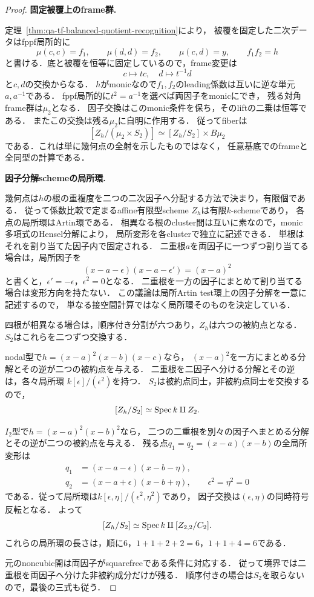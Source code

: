 \begin{proof}
\par\medskip\noindent\textbf{固定被覆上のframe群.}\par\nobreak\smallskip
定理~\ref{thm:qa-tf-balanced-quotient-recognition}により，
被覆を固定した二次データはfppf局所的に
\[
 \mu(c,c)=f_1,\qquad\mu(d,d)=f_2,\qquad
 \mu(c,d)=y,\qquad f_1f_2=h
\]
と書ける．底と被覆を恒等に固定しているので，frame変更は
\[
 c\mapsto tc,\quad d\mapsto t^{-1}d
\]
と$c,d$の交換からなる．
$h$がmonicなので$f_1,f_2$のleading係数は互いに逆な単元$a,a^{-1}$である．
fppf局所的に$t^2=a^{-1}$を選べば両因子をmonicにでき，
残る対角frame群は$\mu_2$となる．
因子交換はこのmonic条件を保ち，そのliftの二乗は恒等である．
またこの交換は残る$\mu_2$に自明に作用する．
従ってfiberは
\[
 [Z_h/(\mu_2\times S_2)]
       \simeq[Z_h/S_2]\times B\mu_2
\]
である．これは単に幾何点の全射を示したものではなく，
任意基底でのframeと全同型の計算である．

\par\medskip\noindent\textbf{因子分解schemeの局所環.}\par\nobreak\smallskip
幾何点は$h$の根の重複度を二つの二次因子へ分配する方法で決まり，有限個である．
従って係数比較で定まるaffine有限型scheme $Z_h$は有限$k$-schemeであり，
各点の局所環はArtin環である．
相異なる根のcluster間は互いに素なので，monic多項式のHensel分解により，
局所変形を各clusterで独立に記述できる．
単根はそれを割り当てた因子内で固定される．
二重根$a$を両因子に一つずつ割り当てる場合は，局所因子を
\[
 (x-a-\epsilon)(x-a-\epsilon')=(x-a)^2
\]
と書くと，$\epsilon'=-\epsilon$，$\epsilon^2=0$となる．
二重根を一方の因子にまとめて割り当てる場合は変形方向を持たない．
この議論は局所Artin test環上の因子分解を一意に記述するので，
単なる接空間計算ではなく局所環そのものを決定している．

四根が相異なる場合は，順序付き分割が六つあり，$Z_h$は六つの被約点となる．
$S_2$はこれらを二つずつ交換する．

nodal型で$h=(x-a)^2(x-b)(x-c)$なら，
$(x-a)^2$を一方にまとめる分解とその逆が二つの被約点を与える．
二重根を二因子へ分ける分解とその逆は，各々局所環
$k[\epsilon]/(\epsilon^2)$を持つ．
$S_2$は被約点同士，非被約点同士を交換するので，
\[
             [Z_h/S_2]\simeq\operatorname{Spec} k\amalg Z_2.
\]

$I_2$型で$h=(x-a)^2(x-b)^2$なら，
二つの二重根を別々の因子へまとめる分解とその逆が二つの被約点を与える．
残る点$q_1=q_2=(x-a)(x-b)$の全局所変形は
\[
 \begin{split}
 q_1&=(x-a-\epsilon)(x-b-\eta),\\
 q_2&=(x-a+\epsilon)(x-b+\eta),\qquad
          \epsilon^2=\eta^2=0
 \end{split}
\]
である．従って局所環は$k[\epsilon,\eta]/(\epsilon^2,\eta^2)$であり，
因子交換は$(\epsilon,\eta)$の同時符号反転となる．
よって
\[
             [Z_h/S_2]\simeq\operatorname{Spec} k\amalg[Z_{2,2}/C_2].
\]
これらの局所環の長さは，順に$6$，$1+1+2+2=6$，$1+1+4=6$である．

元のnoncubic開は両因子がsquarefreeである条件に対応する．
従って境界では二重根を両因子へ分けた非被約成分だけが残る．
順序付きの場合は$S_2$を取らないので，最後の三式も従う．
\end{proof}

